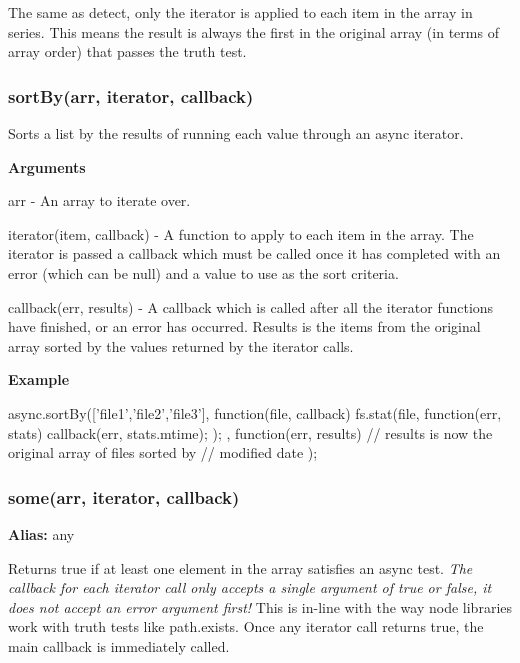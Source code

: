 The same as detect, only the iterator is applied to each item in the array in series. This means the result is always the first in the original array (in terms of array order) that passes the truth test.





\label{_sortBy}%
 \subsubsection*{sort\+By(arr, iterator, callback)}

Sorts a list by the results of running each value through an async iterator.

{\bfseries Arguments}


\begin{DoxyItemize}
\item arr -\/ An array to iterate over.
\item iterator(item, callback) -\/ A function to apply to each item in the array. The iterator is passed a callback which must be called once it has completed with an error (which can be null) and a value to use as the sort criteria.
\item callback(err, results) -\/ A callback which is called after all the iterator functions have finished, or an error has occurred. Results is the items from the original array sorted by the values returned by the iterator calls.
\end{DoxyItemize}

{\bfseries Example} \begin{DoxyVerb}async.sortBy(['file1','file2','file3'], function(file, callback){
    fs.stat(file, function(err, stats){
        callback(err, stats.mtime);
    });
}, function(err, results){
    // results is now the original array of files sorted by
    // modified date
});
\end{DoxyVerb}






\label{_some}%
 \subsubsection*{some(arr, iterator, callback)}

{\bfseries Alias\+:} any

Returns true if at least one element in the array satisfies an async test. {\itshape The callback for each iterator call only accepts a single argument of true or false, it does not accept an error argument first!} This is in-\/line with the way node libraries work with truth tests like path.\+exists. Once any iterator call returns true, the main callback is immediately called.

